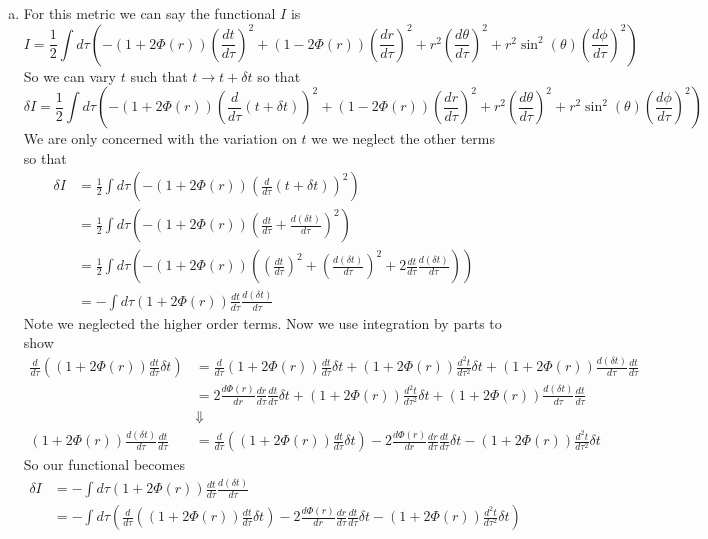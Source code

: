 \documentclass[11pt]{article}
\numberwithin{equation}{section}
\begin{document}
\begin{enumerate}[(a)]
\item
For this metric we can say the functional $I$ is 
$$I = \frac{1}{2}\int d\tau\left(-(1+2\Phi(r))\left(\frac{dt}{d\tau}\right)^2 + (1-2\Phi(r))\left(\frac{dr}{d\tau}\right)^2 + r^2\left(\frac{d\theta}{d\tau}\right)^2+r^2\sin^2(\theta)\left(\frac{d\phi}{d\tau}\right)^2\right)$$
So we can vary $t$ such that $t\rightarrow t+\delta t$ so that
$$\delta I = \frac{1}{2}\int d\tau\left(-(1+2\Phi(r))\left(\frac{d}{d\tau}(t+\delta t)\right)^2 + (1-2\Phi(r))\left(\frac{dr}{d\tau}\right)^2 + r^2\left(\frac{d\theta}{d\tau}\right)^2+r^2\sin^2(\theta)\left(\frac{d\phi}{d\tau}\right)^2\right)$$
We are only concerned with the variation on $t$ we we neglect the other terms so that
\begin{align*}
\delta I &= \frac{1}{2}\int d\tau\left(-(1+2\Phi(r))\left(\frac{d}{d\tau}(t+\delta t)\right)^2\right)\\
&= \frac{1}{2}\int d\tau\left(-(1+2\Phi(r))\left(\frac{dt}{d\tau}+\frac{d(\delta t)}{d\tau}\right)^2\right)\\
&= \frac{1}{2}\int d\tau\left(-(1+2\Phi(r))\left(\left(\frac{dt}{d\tau}\right)^2+\left(\frac{d(\delta t)}{d\tau}\right)^2 + 2\frac{dt}{d\tau}\frac{d(\delta t)}{d\tau}\right)\right)\\
&= -\int d\tau(1+2\Phi(r))\frac{dt}{d\tau}\frac{d(\delta t)}{d\tau}
\end{align*}
Note we neglected the higher order terms. Now we use integration by parts to show
\begin{align*}
\frac{d}{d\tau}\left((1+2\Phi(r))\frac{dt}{d\tau}\delta t\right) &=\frac{d}{d\tau}(1+2\Phi(r))\frac{dt}{d\tau}\delta t + (1+2\Phi(r))\frac{d^2t}{d\tau^2}\delta t + (1+2\Phi(r))\frac{d(\delta t)}{d\tau}\frac{dt}{d\tau}\\
&=2\frac{d\Phi(r)}{dr}\frac{dr}{d\tau}\frac{dt}{d\tau}\delta t + (1+2\Phi(r))\frac{d^2t}{d\tau^2}\delta t + (1+2\Phi(r))\frac{d(\delta t)}{d\tau}\frac{dt}{d\tau}\\
&\Downarrow\\
(1+2\Phi(r))\frac{d(\delta t)}{d\tau}\frac{dt}{d\tau} &= \frac{d}{d\tau}\left((1+2\Phi(r))\frac{dt}{d\tau}\delta t\right) - 2\frac{d\Phi(r)}{dr}\frac{dr}{d\tau}\frac{dt}{d\tau}\delta t - (1+2\Phi(r))\frac{d^2t}{d\tau^2}\delta t 
\end{align*}
So our functional becomes
\begin{align*}
\delta I &= -\int d\tau(1+2\Phi(r))\frac{dt}{d\tau}\frac{d(\delta t)}{d\tau}\\
&= -\int d\tau\left(\frac{d}{d\tau}\left((1+2\Phi(r))\frac{dt}{d\tau}\delta t\right) - 2\frac{d\Phi(r)}{dr}\frac{dr}{d\tau}\frac{dt}{d\tau}\delta t - (1+2\Phi(r))\frac{d^2t}{d\tau^2}\delta t \right)\\

\end{align*}
\end{enumerate}
\end{document}
